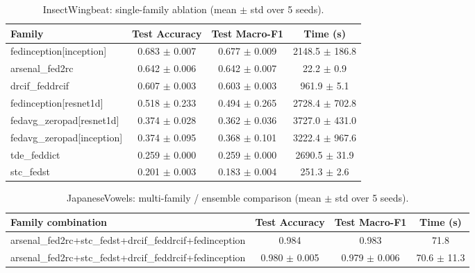 \begin{table}[t]
\centering
\caption{InsectWingbeat: single-family ablation (mean $\pm$ std over 5 seeds).}
\label{tab:results_insectwingbeat_ablation}
\begin{tabular}{lccc}
\toprule
Family & Test Accuracy & Test Macro-F1 & Time (s) \\
\midrule
fedinception[inception] & 0.683 $\pm$ 0.007 & 0.677 $\pm$ 0.009 & 2148.5 $\pm$ 186.8 \\
arsenal\_fed2rc & 0.642 $\pm$ 0.006 & 0.642 $\pm$ 0.007 & 22.2 $\pm$ 0.9 \\
drcif\_feddrcif & 0.607 $\pm$ 0.003 & 0.603 $\pm$ 0.003 & 961.9 $\pm$ 5.1 \\
fedinception[resnet1d] & 0.518 $\pm$ 0.233 & 0.494 $\pm$ 0.265 & 2728.4 $\pm$ 702.8 \\
fedavg\_zeropad[resnet1d] & 0.374 $\pm$ 0.028 & 0.362 $\pm$ 0.036 & 3727.0 $\pm$ 431.0 \\
fedavg\_zeropad[inception] & 0.374 $\pm$ 0.095 & 0.368 $\pm$ 0.101 & 3222.4 $\pm$ 967.6 \\
tde\_feddict & 0.259 $\pm$ 0.000 & 0.259 $\pm$ 0.000 & 2690.5 $\pm$ 31.9 \\
stc\_fedst & 0.201 $\pm$ 0.003 & 0.183 $\pm$ 0.004 & 251.3 $\pm$ 2.6 \\
\bottomrule
\end{tabular}
\end{table}

\begin{table}[t]
\centering
\caption{JapaneseVowels: multi-family / ensemble comparison (mean $\pm$ std over 5 seeds).}
\label{tab:results_japanesevowels_ensemble}
\begin{tabular}{lccc}
\toprule
Family combination & Test Accuracy & Test Macro-F1 & Time (s) \\
\midrule
arsenal\_fed2rc+stc\_fedst+drcif\_feddrcif+fedinception & 0.984 & 0.983 & 71.8 \\
arsenal\_fed2rc+stc\_fedst+drcif\_feddrcif+fedinception & 0.980 $\pm$ 0.005 & 0.979 $\pm$ 0.006 & 70.6 $\pm$ 11.3 \\
\bottomrule
\end{tabular}
\end{table}


